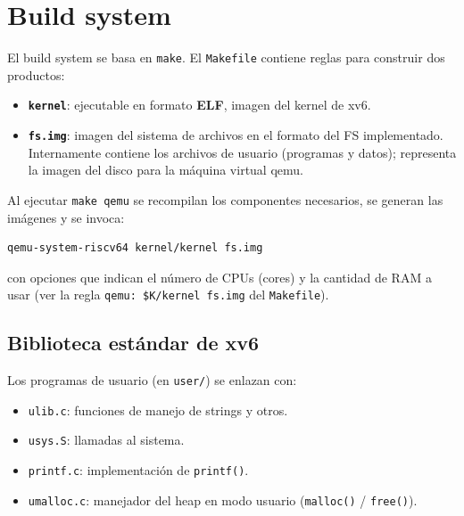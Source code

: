 \documentclass[11pt,a4paper]{article}
\begin{document}
\section{Build system}

El build system se basa en \texttt{make}. El \texttt{Makefile} contiene
reglas para construir dos productos:

\begin{itemize}[leftmargin=*]
    \item \textbf{\texttt{kernel}}: ejecutable en formato \textbf{ELF},
        imagen del kernel de xv6.
    \item \textbf{\texttt{fs.img}}: imagen del sistema de archivos en
        el formato del FS implementado. Internamente contiene los
        archivos de usuario (programas y datos); representa la imagen
        del disco para la máquina virtual qemu.
\end{itemize}

Al ejecutar \texttt{make qemu} se recompilan los componentes
necesarios, se generan las imágenes y se invoca:

\begin{lstlisting}[style=shellstyle]
qemu-system-riscv64 kernel/kernel fs.img
\end{lstlisting}

con opciones que indican el número de CPUs (cores) y la cantidad de
RAM a usar (ver la regla \verb|qemu: $K/kernel fs.img| del
\texttt{Makefile}).

\subsection{Biblioteca estándar de xv6}

Los programas de usuario (en \texttt{user/}) se enlazan con:

\begin{itemize}[leftmargin=*,nosep]
    \item \texttt{ulib.c}: funciones de manejo de strings y otros.
    \item \texttt{usys.S}: llamadas al sistema.
    \item \texttt{printf.c}: implementación de \texttt{printf()}.
    \item \texttt{umalloc.c}: manejador del heap en modo usuario
        (\texttt{malloc()} / \texttt{free()}).
\end{itemize}
\end{document}
